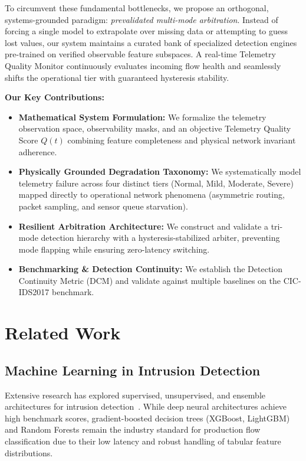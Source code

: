 \documentclass[conference]{IEEEtran}
\begin{document}
To circumvent these fundamental bottlenecks, we propose an orthogonal, systems-grounded paradigm: \textit{prevalidated multi-mode arbitration}. Instead of forcing a single model to extrapolate over missing data or attempting to guess lost values, our system maintains a curated bank of specialized detection engines pre-trained on verified observable feature subspaces. A real-time Telemetry Quality Monitor continuously evaluates incoming flow health and seamlessly shifts the operational tier with guaranteed hysteresis stability.

\textbf{Our Key Contributions:}
\begin{itemize}
    \item \textbf{Mathematical System Formulation:} We formalize the telemetry observation space, observability masks, and an objective Telemetry Quality Score $Q(t)$ combining feature completeness and physical network invariant adherence.
    \item \textbf{Physically Grounded Degradation Taxonomy:} We systematically model telemetry failure across four distinct tiers (Normal, Mild, Moderate, Severe) mapped directly to operational network phenomena (asymmetric routing, packet sampling, and sensor queue starvation).
    \item \textbf{Resilient Arbitration Architecture:} We construct and validate a tri-mode detection hierarchy with a hysteresis-stabilized arbiter, preventing mode flapping while ensuring zero-latency switching.
    \item \textbf{Benchmarking & Detection Continuity:} We establish the Detection Continuity Metric (DCM) and validate against multiple baselines on the CIC-IDS2017 benchmark.
\end{itemize}

\section{Related Work}
\subsection{Machine Learning in Intrusion Detection}
Extensive research has explored supervised, unsupervised, and ensemble architectures for intrusion detection~\cite{sarhan2023towards}. While deep neural architectures achieve high benchmark scores, gradient-boosted decision trees (XGBoost, LightGBM) and Random Forests remain the industry standard for production flow classification due to their low latency and robust handling of tabular feature distributions.
\end{document}
